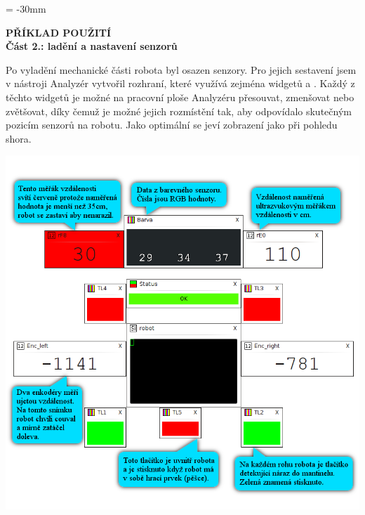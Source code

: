 \documentclass[17pt]{extreport}
\newcommand{\B}{\textbf} %
\begin{document}
\newpage
\enlargethispage{100mm} %
\voffset = -30mm %
\begin{center}
    \Large \B{PŘÍKLAD POUŽITÍ \\ Část 2.: ladění a nastavení senzorů}
\end{center}
\vspace{5mm}
Po vyladění mechanické části robota byl osazen senzory. Pro jejich sestavení jsem v nástroji Analyzér vytvořil rozhraní, které využívá zejména widgetů  a . Každý z těchto widgetů je možné na pracovní ploše Analyzéru přesouvat, zmenšovat nebo zvětšovat, díky čemuž je možné jejich rozmístění tak, aby odpovídalo skutečným pozicím senzorů na robotu. Jako optimální se jeví zobrazení jako při pohledu shora.

\vspace{30mm}
\begin{center}
\includegraphics{img/sensors2.png}
\end{center}
\end{document}
